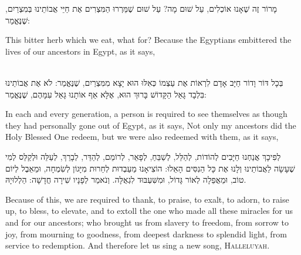 
מָרוֹר זֶה שֶׁאָנוּ אוֹכְלִים, עַל שׁוּם מָה? עַל שׁוּם שֶׁמֵּרְרוּ הַמִּצְרִים אֶת חַיֵּי אֲבוֹתֵינוּ בְּמִצְרַיִם, שֶׁנֶּאֱמַר:

\begin{english}
This bitter herb which we eat, what for? Because the Egyptians embittered the lives of our ancestors in Egypt, as it says, 
\end{english}

\ \\

בְּכָל דּוֹר וָדוֹר חַיָּב אָדָם לִרְאוֹת אֶת עַצְמוֹ כְּאִלּוּ הוּא יָצָא מִמִּצְרַיִם, שֶׁנֶּאֱמַר: 
לֹא אֶת אֲבוֹתֵינוּ בִּלְבָד גָּאַל הַקָּדוֹשׁ בָּרוּךְ הוּא, אֶלָּא אַף אוֹתָנוּ גָּאַל עִמָּהֶם, שֶׁנֶּאֱמַר: 

\begin{english}
In each and every generation, a person is required to see themselves as though they had personally gone out of Egypt, as it says,  Not only my ancestors did the Holy Blessed One redeem, but we were also redeemed with them, as it says, 
\end{english}

לְפִיכָךְ אֲנַחְנוּ חַיָּבִים לְהוֹדוֹת, לְהַלֵּל, לְשַׁבֵּחַ, לְפָאֵר, לְרוֹמֵם, לְהַדֵּר, לְבָרֵךְ, לְעַלֵּה וּלְקַלֵּס לְמִי שֶׁעָשָׂה לַאֲבוֹתֵינוּ וְלָנוּ אֶת כָּל הַנִסִּים הָאֵלוּ: הוֹצִיאָנוּ מֵעַבְדוּת לְחֵרוּת מִיָּגוֹן לְשִׂמְחָה, וּמֵאֵבֶל לְיוֹם טוֹב, וּמֵאֲפֵלָה לְאוֹר גָּדוֹל, וּמִשִּׁעְבּוּד לִגְאֻלָּה. וְנֹאמַר לְפָנָיו שִׁירָה חֲדָשָׁה: הַלְלוּיָהּ.

\begin{english}
Because of this, we are required to thank, to praise, to exalt, to adorn, to raise up, to bless, to elevate, and to extoll the one who made all these miracles for us and for our ancestors; who brought us from slavery to freedom, from sorrow to joy, from mourning to goodness, from deepest darkness to splendid light, from service to redemption. And therefore let us sing a new song, {\scshape Halleluyah}.
\end{english}

